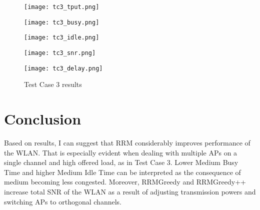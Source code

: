\begin{figure}[!ht]
    \centering
    \begin{minipage}[b]{0.48\textwidth}
        \centering
        \texttt{[image: tc3\_tput.png]}
        \label{fig:tc3:tput}
    \end{minipage}
    \hfill
    \begin{minipage}[b]{0.48\textwidth}
        \centering
        \texttt{[image: tc3\_busy.png]}
        \label{fig:tc3:busy}
    \end{minipage}
    
    \vspace{0.1em}
    
    \begin{minipage}[b]{0.48\textwidth}
        \centering
        \texttt{[image: tc3\_idle.png]}
        \label{fig:tc3:idle}
    \end{minipage}
    \hfill
    \begin{minipage}[b]{0.48\textwidth}
        \centering
        \texttt{[image: tc3\_snr.png]}
        \label{fig:tc3:snr}
    \end{minipage}
    
    \vspace{0.1em}
    
    \begin{minipage}[b]{0.48\textwidth}
        \centering
        \texttt{[image: tc3\_delay.png]}
        \label{fig:tc3:l3delay}
    \end{minipage}
    
    \caption{Test Case 3 results}
    \label{fig:tc3:plots}
\end{figure}


\section{Conclusion}
\label{chap:impl:sec:conclusion}

Based on results, I can suggest that RRM considerably improves performance of the WLAN. That is especially evident when dealing with multiple APs on a single channel and high offered load, as in Test Case 3. Lower Medium Busy Time and higher Medium Idle Time can be interpreted as the consequence of medium becoming less congested. Moreover, RRMGreedy and RRMGreedy++ increase total SNR of the WLAN as a result of adjusting transmission powers and switching APs to orthogonal channels.

